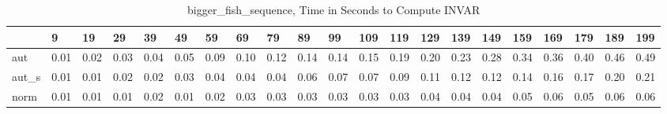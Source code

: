 \begin{table}
\caption{bigger_fish_sequence, Time in Seconds to Compute INVAR}
\label{bigger_fish_sequence_INVAR_time}
\begin{tabular}{lllllllllllllllllllll}
\toprule
 & 9 & 19 & 29 & 39 & 49 & 59 & 69 & 79 & 89 & 99 & 109 & 119 & 129 & 139 & 149 & 159 & 169 & 179 & 189 & 199 \\
\midrule
aut & 0.01 & 0.02 & 0.03 & 0.04 & 0.05 & 0.09 & 0.10 & 0.12 & 0.14 & 0.14 & 0.15 & 0.19 & 0.20 & 0.23 & 0.28 & 0.34 & 0.36 & 0.40 & 0.46 & 0.49 \\
aut_s & 0.01 & 0.01 & 0.02 & 0.02 & 0.03 & 0.04 & 0.04 & 0.04 & 0.06 & 0.07 & 0.07 & 0.09 & 0.11 & 0.12 & 0.12 & 0.14 & 0.16 & 0.17 & 0.20 & 0.21 \\
norm & 0.01 & 0.01 & 0.01 & 0.02 & 0.01 & 0.02 & 0.03 & 0.03 & 0.03 & 0.03 & 0.03 & 0.03 & 0.04 & 0.04 & 0.04 & 0.05 & 0.06 & 0.05 & 0.06 & 0.06 \\
\bottomrule
\end{tabular}
\end{table}
